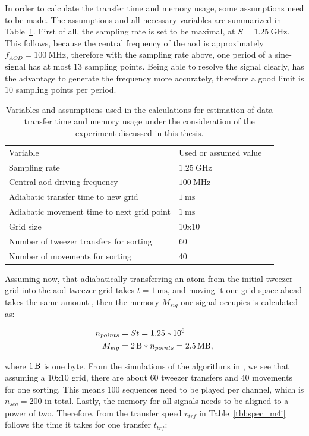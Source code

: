 In order to calculate the transfer time and memory usage, some assumptions need to be made. The assumptions and all necessary variables are summarized in Table~\ref{tbl:spectrum_assumptions}. First of all, the sampling rate is set to be maximal, at $S=\SI{1.25}{\giga\hertz}$. This follows, because the central frequency of the \ac{aod} is approximately $f_{AOD}=\SI{100}{\mega\hertz}$, therefore with the sampling rate above, one period of a sine-signal has at most $13$ sampling points. Being able to resolve the signal clearly, has the advantage to generate the frequency more accurately, therefore a good limit is $10$ sampling points per period.

\begin{table}[tb]
\label{tbl:spectrum_assumptions}
\centering
\begin{tabular}{l|l|l}
	\hline \hline
	Variable & Used or assumed value \\ \thickhline
	Sampling rate & $\SI{1.25}{\giga\hertz}$ \\
	Central \ac{aod} driving frequency & $\SI{100}{\mega\hertz}$ \\
	Adiabatic transfer time to new grid & $\SI{1}{\milli\second}$ \\
	Adiabatic movement time to next grid point & $\SI{1}{\milli\second}$ \\
	Grid size & 10x10 \\
	Number of tweezer transfers for sorting & 60 \\
	Number of movements for sorting & 40 \\
	\hline \hline
\end{tabular}
\caption{Variables and assumptions used in the calculations for estimation of data transfer time and memory usage under the consideration of the experiment discussed in this thesis.}
\end{table}

Assuming now, that adiabatically transferring an atom from the initial tweezer grid into the \ac{aod} tweezer grid takes $t=\SI{1}{\milli\second}$, and moving it one grid space ahead takes the same amount , then the memory $M_{sig}$ one signal occupies is calculated as:

\begin{align}
	n_{points} &= S t = 1.25 * 10^6 \\
	M_{sig} &= \SI{2}{\byte} * n_{points} = \SI{2.5}{\mega\byte},
\end{align}

where $\SI{1}{\byte}$ is one byte. From the simulations of the algorithms in , we see that assuming a 10x10 grid, there are about 60 tweezer transfers and 40 movements for one sorting. This means 100 sequences need to be played per channel, which is $n_{seq}=200$ in total. Lastly, the memory for all signals needs to be aligned to a power of two. Therefore, from the transfer speed $v_{trf}$ in Table~\ref{tbl:spec_m4i} follows the time it takes for one transfer $t_{trf}$:

